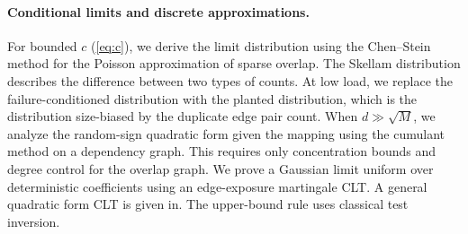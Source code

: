 \paragraph{Conditional limits and discrete approximations.} For bounded $c$ (\eqref{eq:c}), we derive the limit distribution using the Chen--Stein method\cite{arratia1989chen} for the Poisson approximation of sparse overlap. The Skellam distribution\cite{skellam1946} describes the difference between two types of counts. At low load, we replace the failure-conditioned distribution with the planted distribution, which is the distribution size-biased by the duplicate edge pair count\cite{arratia2019sizebias}. When $d\gg\sqrt M$, we analyze the random-sign quadratic form given the mapping using the cumulant method on a dependency graph\cite{janson1988cumulant}. This requires only concentration bounds\cite{warnke2016typical,combes2015mcdiarmid} and degree control for the overlap graph. We prove a Gaussian limit uniform over deterministic coefficients using an edge-exposure martingale CLT\cite{hall1980martingale}. A general quadratic form CLT is given in\cite{dejong}. The upper-bound rule uses classical test inversion\cite{neyman1937}.
